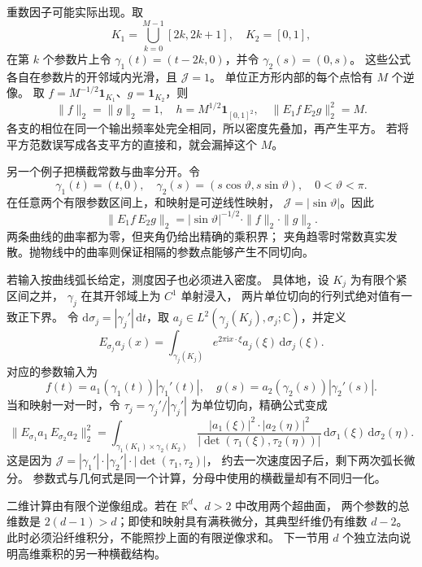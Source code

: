 重数因子可能实际出现。取
\[
 K_1=\bigcup_{k=0}^{M-1}[2k,2k+1],\quad K_2=[0,1],
\]
在第 \(k\) 个参数片上令
\(\gamma_1(t)=(t-2k,0)\)，并令 \(\gamma_2(s)=(0,s)\)。
这些公式各自在参数片的开邻域内光滑，且 \(\mathcal J=1\)。
单位正方形内部的每个点恰有 \(M\) 个逆像。
取 \(f=M^{-1/2}\mathbf1_{K_1}\)、\(g=\mathbf1_{K_2}\)，则
\[
 \|f\|_2=\|g\|_2=1,\quad
 h=M^{1/2}\mathbf1_{[0,1]^2},\quad
 \|E_1f\,E_2g\|_2^2=M.
\]
各支的相位在同一个输出频率处完全相同，所以密度先叠加，再产生平方。
若将平方范数误写成各支平方的直接和，就会漏掉这个 \(M\)。

\ProseParagraphBreak
另一个例子把横截常数与曲率分开。令
\[
 \gamma_1(t)=(t,0),\quad
 \gamma_2(s)=(s\cos\vartheta,s\sin\vartheta),
 \quad 0<\vartheta<\pi.
\]
在任意两个有限参数区间上，和映射是可逆线性映射，
\(\mathcal J=|\sin\vartheta|\)。因此
\[
 \|E_1f\,E_2g\|_2
 =|\sin\vartheta|^{-1/2}
 \cdot\|f\|_2\cdot\|g\|_2.
\]
两条曲线的曲率都为零，但夹角仍给出精确的乘积界；
夹角趋零时常数真实发散。抛物线中的曲率则保证相隔的参数点能够产生不同切向。

\ProseParagraphBreak
若输入按曲线弧长给定，测度因子也必须进入密度。
具体地，设 \(K_j\) 为有限个紧区间之并，
\(\gamma_j\) 在其开邻域上为 \(C^1\) 单射浸入，
两片单位切向的行列式绝对值有一致正下界。
令 \(\mathrm d\sigma_j=|\gamma_j'|\,\mathrm dt\)，取
\(a_j\in L^2(\gamma_j(K_j),\sigma_j;\mathbb C)\)，并定义
\[
 E_{\sigma_j}a_j(x)=\int_{\gamma_j(K_j)}
 e^{2\pi\mathrm ix\cdot\xi}a_j(\xi)\,\mathrm d\sigma_j(\xi).
\]
对应的参数输入为
\[
 f(t)=a_1(\gamma_1(t))|\gamma_1'(t)|,\quad
 g(s)=a_2(\gamma_2(s))|\gamma_2'(s)|.
\]
当和映射一对一时，令
\(\tau_j=\gamma_j'/|\gamma_j'|\) 为单位切向，精确公式变成
\[
 \|E_{\sigma_1}a_1\,E_{\sigma_2}a_2\|_2^2
 =\int_{\gamma_1(K_1)\times\gamma_2(K_2)}
 \frac{|a_1(\xi)|^2\cdot|a_2(\eta)|^2}
 {|\det(\tau_1(\xi),\tau_2(\eta))|}
 \,\mathrm d\sigma_1(\xi)\,\mathrm d\sigma_2(\eta).
\]
这是因为
\(\mathcal J=|\gamma_1'|\cdot|\gamma_2'|\cdot|\det(\tau_1,\tau_2)|\)，
约去一次速度因子后，剩下两次弧长微分。
参数式与几何式是同一个计算，分母中使用的横截量却有不同归一化。

二维计算由有限个逆像组成。若在 \(\mathbb R^d\)、\(d>2\) 中改用两个超曲面，
两个参数的总维数是 \(2(d-1)>d\)；即使和映射具有满秩微分，其典型纤维仍有维数 \(d-2\)。
此时必须沿纤维积分，不能照抄上面的有限逆像求和。
下一节用 \(d\) 个独立法向说明高维乘积的另一种横截结构。
